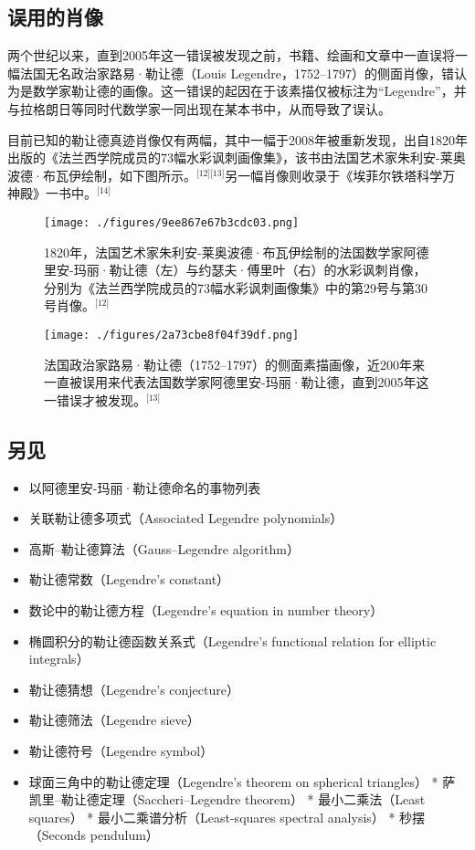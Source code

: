 \subsection{误用的肖像}
两个世纪以来，直到2005年这一错误被发现之前，书籍、绘画和文章中一直误将一幅法国无名政治家路易·勒让德（Louis Legendre，1752–1797）的侧面肖像，错认为是数学家勒让德的画像。这一错误的起因在于该素描仅被标注为“Legendre”，并与拉格朗日等同时代数学家一同出现在某本书中，从而导致了误认。

目前已知的勒让德真迹肖像仅有两幅，其中一幅于2008年被重新发现，出自1820年出版的《法兰西学院成员的73幅水彩讽刺画像集》，该书由法国艺术家朱利安-莱奥波德·布瓦伊绘制，如下图所示。\(^\text{[12][13]}\)另一幅肖像则收录于《埃菲尔铁塔科学万神殿》一书中。\(^\text{[14]}\)
\begin{figure}[ht]
\centering
\texttt{[image: ./figures/9ee867e67b3cdc03.png]}
\caption{1820年，法国艺术家朱利安-莱奥波德·布瓦伊绘制的法国数学家阿德里安-玛丽·勒让德（左）与约瑟夫·傅里叶（右）的水彩讽刺肖像，分别为《法兰西学院成员的73幅水彩讽刺画像集》中的第29号与第30号肖像。\(^\text{[12]}\)} \label{fig_adla_4}
\end{figure}
\begin{figure}[ht]
\centering
\texttt{[image: ./figures/2a73cbe8f04f39df.png]}
\caption{法国政治家路易·勒让德（1752–1797）的侧面素描画像，近200年来一直被误用来代表法国数学家阿德里安-玛丽·勒让德，直到2005年这一错误才被发现。\(^\text{[13]}\)} \label{fig_adla_5}
\end{figure}
\subsection{另见}
\begin{itemize}
\item 以阿德里安-玛丽·勒让德命名的事物列表

\item 关联勒让德多项式（Associated Legendre polynomials）
\item 高斯–勒让德算法（Gauss–Legendre algorithm）
\item 勒让德常数（Legendre's constant）
\item 数论中的勒让德方程（Legendre's equation in number theory）
\item 椭圆积分的勒让德函数关系式（Legendre's functional relation for elliptic integrals）
\item 勒让德猜想（Legendre's conjecture）
\item 勒让德筛法（Legendre sieve）
\item 勒让德符号（Legendre symbol）
\item 球面三角中的勒让德定理（Legendre's theorem on spherical triangles）
* 萨凯里–勒让德定理（Saccheri–Legendre theorem）
* 最小二乘法（Least squares）
* 最小二乘谱分析（Least-squares spectral analysis）
* 秒摆（Seconds pendulum）

\end{itemize}